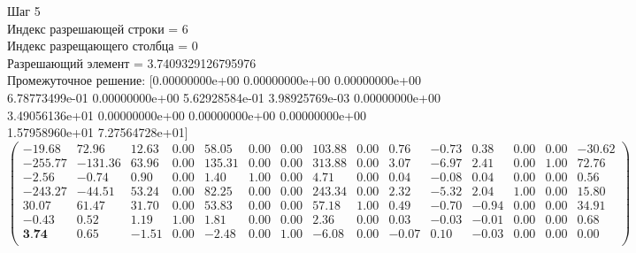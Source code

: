 \documentclass[draft]{article}
\begin{document}
\begin{flushleft}
    Шаг 5 \\
    Индекс разрешающей строки = 6\\
    Индекс разрещающего столбца = 0\\
    Разрешающий элемент = 3.7409329126795976\\
    Промежуточное решение:
    [0.00000000e+00  0.00000000e+00  0.00000000e+00  6.78773499e-01
    0.00000000e+00  5.62928584e-01  3.98925769e-03  0.00000000e+00
    3.49056136e+01  0.00000000e+00  0.00000000e+00  0.00000000e+00
    1.57958960e+01  7.27564728e+01]
\begin{equation*}
\begin{pmatrix}
    -19.68 &   72.96 & 12.63 & 0.00 &  58.05 & 0.00 & 0.00 & 103.88 & 0.00 &  0.76 & -0.73 &  0.38 & 0.00 & 0.00 & -30.62 \\
    -255.77 & -131.36 & 63.96 & 0.00 & 135.31 & 0.00 & 0.00 & 313.88 & 0.00 &  3.07 & -6.97 &  2.41 & 0.00 & 1.00 &  72.76 \\
    -2.56 &   -0.74 &  0.90 & 0.00 &   1.40 & 1.00 & 0.00 &   4.71 & 0.00 &  0.04 & -0.08 &  0.04 & 0.00 & 0.00 &   0.56 \\
    -243.27 &  -44.51 & 53.24 & 0.00 &  82.25 & 0.00 & 0.00 & 243.34 & 0.00 &  2.32 & -5.32 &  2.04 & 1.00 & 0.00 &  15.80 \\
    30.07 &   61.47 & 31.70 & 0.00 &  53.83 & 0.00 & 0.00 &  57.18 & 1.00 &  0.49 & -0.70 & -0.94 & 0.00 & 0.00 &  34.91 \\
    -0.43 &    0.52 &  1.19 & 1.00 &   1.81 & 0.00 & 0.00 &   2.36 & 0.00 &  0.03 & -0.03 & -0.01 & 0.00 & 0.00 &   0.68 \\
    \textbf{3.74} &    0.65 & -1.51 & 0.00 &  -2.48 & 0.00 & 1.00 &  -6.08 & 0.00 & -0.07 &  0.10 & -0.03 & 0.00 & 0.00 &   0.00 \\
\end{pmatrix}
\end{equation*}
\end{flushleft}
\end{document}
